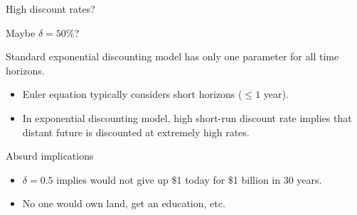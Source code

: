 \documentclass[aspectratio=169, 10pt, handout]{beamer}
\newenvironment{wideitemize}{\itemize\addtolength{\itemsep}{10pt}}{\enditemize}
\begin{document}
\begin{frame}{High discount rates?}

\begin{wideitemize}

	\item Maybe $\delta = 50\%$?
	
	\item Standard exponential discounting model has only one parameter for all time horizons.
	
	\begin{itemize}
	
	    \item Euler equation typically considers short horizons ($\leq 1$ year).
    
        \item In exponential discounting model, high short-run discount rate implies that distant future is discounted at extremely high rates.

	    
	\end{itemize}

    \item Absurd implications

	\begin{itemize}

		\item $\delta = 0.5$ implies would not give up \$1 today for \$1 billion in 30 years.
		
		\item No one would own land, get an education, etc.

	\end{itemize}	

\end{wideitemize}

\end{frame}
\end{document}
